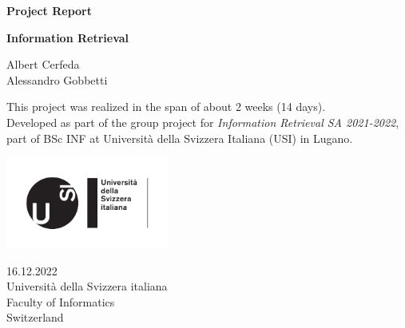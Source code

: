\documentclass[tikz,14pt]{article}
\newcommand\assignmenttitle{Project Report}
\newcommand\namesurname{Albert Cerfeda\\Alessandro Gobbetti}
\newcommand\assignment{}
\newcommand\subject{Information Retrieval}
\newcommand\documentdate{16.12.2022}
\begin{document}
\begin{titlepage}
   \begin{center}
       \vspace*{1cm}

       \textbf{\Large{\assignmenttitle}}

       \vspace{0.5cm}
        \textbf{\subject}\\[5mm]
       \assignment
        
            
       \vspace{1.1cm}

        \namesurname\\
        \vspace{1cm}

        This project was realized in the span of about 2 weeks (14 days).\\
Developed as part of the group project for \textit{Information Retrieval SA 2021-2022}, part of BSc INF at Università della Svizzera Italiana (USI) in Lugano.
       \tableofcontents
       

       \vspace*{\fill}
     
       \includegraphics[width=0.4\textwidth]{fig/logo.pdf}
       
        \documentdate \\
        Università della Svizzera italiana\\
        Faculty of Informatics\\
        Switzerland\\

   \end{center}
\end{titlepage}

\end{document}
